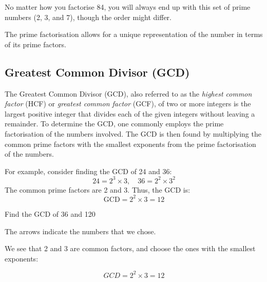 No matter how you factorise 84, you will always end up with this set of prime numbers (2, 3, and 7), though the order might differ.

The prime factorisation allows for a unique representation of the number in terms of its prime factors.

\subsection*{Greatest Common Divisor (GCD)}
The Greatest Common Divisor (GCD), also referred to as the \textit{highest common factor} (HCF) or \textit{greatest common factor} (GCF), of two or more integers is the largest positive integer that divides each of the given integers without leaving a remainder. To determine the GCD, one commonly employs the prime factorisation of the numbers involved. The GCD is then found by multiplying the common prime factors with the smallest exponents from the prime factorisation of the numbers.

For example, consider finding the GCD of 24 and 36:
\[
24 = 2^3 \times 3, \quad 36 = 2^2 \times 3^2
\]
The common prime factors are 2 and 3. Thus, the GCD is:
\[
\text{GCD} = 2^2 \times 3 = 12
\]

\begin{example} Find the GCD of 36 and 120

\begin{solution}
    

The arrows indicate the numbers that we chose.


We see that 2 and 3 are common factors, and choose the ones with the smallest exponents:

\[
GCD = 2^2\times 3 = 12
\]
\end{solution}

\end{example}
 
